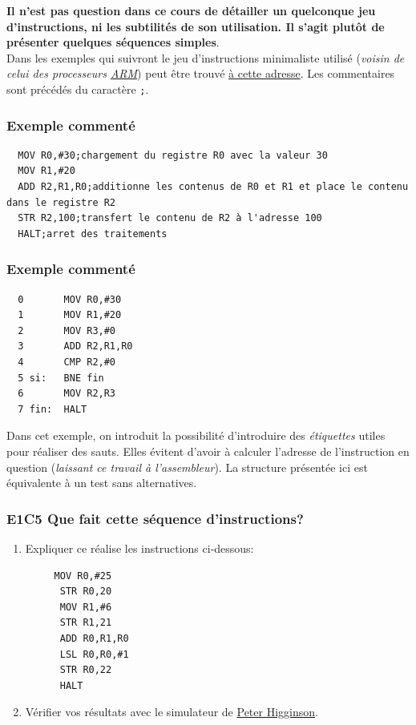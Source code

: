\documentclass[11pt,french]{article}
\begin{document}
\textbf{Il n'est pas question dans ce cours de
détailler un quelconque jeu d'instructions, ni les subtilités de son
utilisation. Il s'agit plutôt de présenter quelques séquences simples}.\\

Dans les exemples qui suivront le jeu d'instructions minimaliste utilisé
(\textit{voisin de celui des processeurs
\href{https://fr.wikipedia.org/wiki/Architecture_ARM}{ARM}}) peut être
trouvé \href{http://www.peterhigginson.co.uk/AQA/info.html}{à cette
adresse}. Les commentaires sont précédés du caractère \texttt{;}. 

\hypertarget{exemple-1}{%
\subsubsection{Exemple commenté }\label{exemple-1}}
\begin{verbatim}
  MOV R0,#30;chargement du registre R0 avec la valeur 30
  MOV R1,#20
  ADD R2,R1,R0;additionne les contenus de R0 et R1 et place le contenu dans le registre R2
  STR R2,100;transfert le contenu de R2 à l'adresse 100
  HALT;arret des traitements
\end{verbatim}

\hypertarget{exemple-2}{%
\subsubsection{Exemple commenté }\label{exemple-2}}
\begin{verbatim}
  0       MOV R0,#30
  1       MOV R1,#20
  2       MOV R3,#0
  3       ADD R2,R1,R0
  4       CMP R2,#0
  5 si:   BNE fin
  6       MOV R2,R3
  7 fin:  HALT
\end{verbatim}
Dans cet exemple, on introduit la possibilité d'introduire des
\emph{étiquettes} utiles pour réaliser des sauts. Elles évitent d'avoir à
calculer l'adresse de l'instruction en question (\emph{laissant ce
travail à l'assembleur}). La structure présentée ici est équivalente à
un test sans alternatives.

\hypertarget{e1c5-que-fait-cette-suxe9quence-dinstructions}{%
\subsubsection{E1C5 Que fait cette séquence
d'instructions?}\label{e1c5-que-fait-cette-suxe9quence-dinstructions}}
\begin{enumerate}
\item Expliquer ce réalise les instructions ci-dessous:
	\begin{verbatim}
	 MOV R0,#25
      STR R0,20
      MOV R1,#6
      STR R1,21
      ADD R0,R1,R0
      LSL R0,R0,#1
      STR R0,22
      HALT
	\end{verbatim}
\item Vérifier vos résultats avec le simulateur de
\href{http://www.peterhigginson.co.uk/AQA/}{Peter Higginson}.
\end{enumerate}
\end{document}
